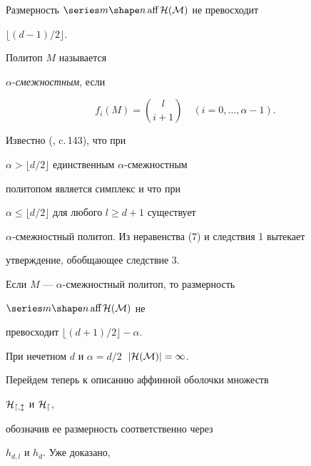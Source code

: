 \begin{cor}


Размерность $\aff\cal H(M)$ не превосходит


$\lfloor(d-1)/2\rfloor$.


\end{cor}





\begin{defn} Политоп $M$ называется


$\alpha$-{\em смежностным}, если


$$


f_i(M)=\binom{l}{i+1}\quad (i=0,\dotsc,\alpha-1).


$$


\end{defn}





Известно (\cite{Bre}, c.\,143), что при


$\alpha>\lfloor d/2 \rfloor$ единственным $\alpha$-смежностным


политопом является симплекс и что при


$\alpha\le\lfloor d/2\rfloor$ для любого $l\ge d+1$ существует


$\alpha$-смежностный политоп. Из неравенства (7) и следствия 1 вытекает


утверждение, обобщающее следствие 3.





\begin{cor}


Если $M$ --- $\alpha$-смежностный политоп, то размерность


$\aff\cal H(M)$ не


превосходит $\lfloor(d+1)/2\rfloor-\alpha$.


При нечетном $d$ и $\alpha=d/2\;$ $|\cal H(M)|=1$.


\end{cor}





Перейдем теперь к описанию аффинной оболочки множеств


$\cal H_{d,l}$ и $\cal H_d$,


обозначив ее размерность соответственно через


$h_{d,l}$ и $h_d$. Уже доказано,


